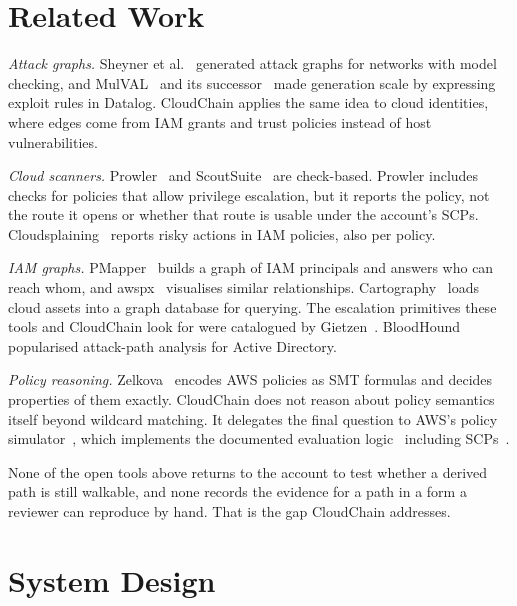 \documentclass[conference]{IEEEtran}
\begin{document}
\section{Related Work}

\textit{Attack graphs.} Sheyner et al.~\cite{sheyner2002} generated attack graphs for networks with model checking, and MulVAL~\cite{mulval} and its successor~\cite{ou2006} made generation scale by expressing exploit rules in Datalog. CloudChain applies the same idea to cloud identities, where edges come from IAM grants and trust policies instead of host vulnerabilities.

\textit{Cloud scanners.} Prowler~\cite{prowler} and ScoutSuite~\cite{scoutsuite} are check-based. Prowler includes checks for policies that allow privilege escalation, but it reports the policy, not the route it opens or whether that route is usable under the account's SCPs. Cloudsplaining~\cite{cloudsplaining} reports risky actions in IAM policies, also per policy.

\textit{IAM graphs.} PMapper~\cite{pmapper} builds a graph of IAM principals and answers who can reach whom, and awspx~\cite{awspx} visualises similar relationships. Cartography~\cite{cartography} loads cloud assets into a graph database for querying. The escalation primitives these tools and CloudChain look for were catalogued by Gietzen~\cite{gietzen2018}. BloodHound~\cite{bloodhound} popularised attack-path analysis for Active Directory.

\textit{Policy reasoning.} Zelkova~\cite{zelkova} encodes AWS policies as SMT formulas and decides properties of them exactly. CloudChain does not reason about policy semantics itself beyond wildcard matching. It delegates the final question to AWS's policy simulator~\cite{awssim}, which implements the documented evaluation logic~\cite{awseval} including SCPs~\cite{awsscp}.

None of the open tools above returns to the account to test whether a derived path is still walkable, and none records the evidence for a path in a form a reviewer can reproduce by hand. That is the gap CloudChain addresses.

\section{System Design}\label{sec:design}
\end{document}
